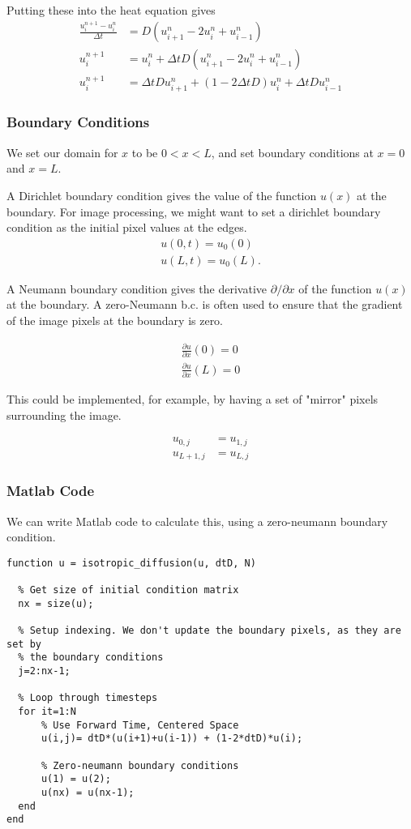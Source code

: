 \documentclass[11pt,a4paper,noindent]{article}
\begin{document}
Putting these into the heat equation gives
\begin{align} \label{eq:finitedifference}
\frac{u^{n+1}_i-u^{n}_i}{\Delta t} &= D (u^n_{i+1} - 2u^n_{i} + u^n_{i-1}) \\
u^{n+1}_i &= u^{n}_i + \Delta t D (u^n_{i+1} - 2u^n_{i} + u^n_{i-1}) \\
u^{n+1}_i &= \Delta t D u^n_{i+1} + (1-2\Delta t D)u^n_{i} + \Delta t D u^n_{i-1}
\end{align}

\subsubsection{Boundary Conditions}
We set our domain for $x$ to be $0 < x < L$, and set boundary conditions at $x=0$ and $x=L$.

A Dirichlet boundary condition gives the value of the function $u(x)$ at the boundary. For image processing, we might want to set a dirichlet boundary condition as the initial pixel values at the edges.
\begin{align}
u(0,t) = u_0(0)\\
u(L,t) = u_0(L).
\end{align}

A Neumann boundary condition gives the derivative $\partial / \partial x$ of the function $u(x)$ at the boundary. A zero-Neumann b.c. is often used to ensure that the gradient of the image pixels at the boundary is zero. 

\begin{align}
\frac{\partial u}{\partial x}(0)=0\\
\frac{\partial u}{\partial x}(L)=0
\end{align}

This could be implemented, for example, by having a set of "mirror" pixels surrounding the image.

\begin{align}
u_{0,j} &= u_{1,j}\\
u_{L+1,j} &= u_{L,j}
\end{align}


\subsubsection{Matlab Code}
We can write Matlab code to calculate this, using a zero-neumann boundary condition.

\begin{lstlisting}
function u = isotropic_diffusion(u, dtD, N)

  % Get size of initial condition matrix
  nx = size(u);

  % Setup indexing. We don't update the boundary pixels, as they are set by
  % the boundary conditions
  j=2:nx-1;
  
  % Loop through timesteps
  for it=1:N
      % Use Forward Time, Centered Space
      u(i,j)= dtD*(u(i+1)+u(i-1)) + (1-2*dtD)*u(i);
      
      % Zero-neumann boundary conditions
      u(1) = u(2);
      u(nx) = u(nx-1);
  end
end
\end{lstlisting}
\end{document}
